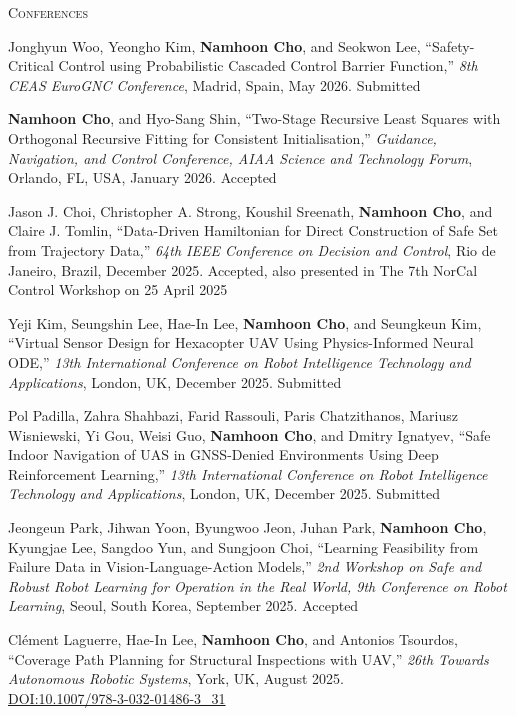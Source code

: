 \textsc{Conferences}
\vspace{0.5em}
\begin{enumerate}[itemsep=0.5em, label={[}C\arabic*{]}]
\item Jonghyun Woo, Yeongho Kim, \textbf{Namhoon Cho}, and Seokwon Lee, ``Safety-Critical Control using Probabilistic Cascaded Control Barrier Function,'' \textit{8th CEAS EuroGNC Conference}, Madrid, Spain, May 2026. Submitted 

\item \textbf{Namhoon Cho}, and Hyo-Sang Shin, ``Two-Stage Recursive Least Squares with Orthogonal Recursive Fitting for Consistent Initialisation,'' \textit{Guidance, Navigation, and Control Conference, AIAA Science and Technology Forum}, Orlando, FL, USA, January 2026. Accepted 

\item Jason J. Choi, Christopher A. Strong, Koushil Sreenath, \textbf{Namhoon Cho}, and Claire J. Tomlin, ``Data-Driven Hamiltonian for Direct Construction of Safe Set from Trajectory Data,'' \textit{64th IEEE Conference on Decision and Control}, Rio de Janeiro, Brazil, December 2025. Accepted, also presented in The 7th NorCal Control Workshop on 25 April 2025 

\item Yeji Kim, Seungshin Lee, Hae-In Lee, \textbf{Namhoon Cho}, and Seungkeun Kim, ``Virtual Sensor Design for Hexacopter UAV Using Physics-Informed Neural ODE,'' \textit{13th International Conference on Robot Intelligence Technology and Applications}, London, UK, December 2025. Submitted 

\item Pol Padilla, Zahra Shahbazi, Farid Rassouli, Paris Chatzithanos, Mariusz Wisniewski, Yi Gou, Weisi Guo, \textbf{Namhoon Cho}, and Dmitry Ignatyev, ``Safe Indoor Navigation of UAS in GNSS-Denied Environments Using Deep Reinforcement Learning,'' \textit{13th International Conference on Robot Intelligence Technology and Applications}, London, UK, December 2025. Submitted 

\item Jeongeun Park, Jihwan Yoon, Byungwoo Jeon, Juhan Park, \textbf{Namhoon Cho}, Kyungjae Lee, Sangdoo Yun, and Sungjoon Choi, ``Learning Feasibility from Failure Data in Vision-Language-Action Models,'' \textit{2nd Workshop on Safe and Robust Robot Learning for Operation in the Real World, 9th Conference on Robot Learning}, Seoul, South Korea, September 2025. Accepted 

\item Clément Laguerre, Hae-In Lee, \textbf{Namhoon Cho}, and Antonios Tsourdos, ``Coverage Path Planning for Structural Inspections with UAV,'' \textit{26th Towards Autonomous Robotic Systems}, York, UK, August 2025. \\
\href{https://doi.org/10.1007/978-3-032-01486-3_31}{DOI:10.1007/978-3-032-01486-3\_31}


\end{enumerate}
